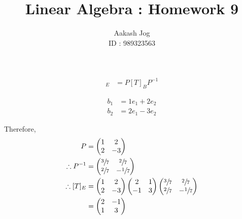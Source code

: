 \documentclass[fleqn, a4paper, twocolumn, draft]{article}
\title{Linear Algebra : Homework 9}
\author{Aakash Jog\\
	ID : 989323563}
\theoremstyle{definition}
\theoremstyle{theorem}
\theoremstyle{remark}
\numberwithin{corollary}{theorem}
\numberwithin{equation}{theorem}
\begin{document}
\maketitle

\section{}

\subsection{}

\begin{align*}
	[T]_E &= P [T]_B P^{-1}
\end{align*}

\begin{align*}
	b_1 &= 1 e_1 + 2 e_2\\
	b_2 &= 2 e_1 - 3 e_2
\end{align*}

Therefore,
\begin{align*}
	P &= 
		\begin{pmatrix}
			1 & 2\\
			2 & -3\\
		\end{pmatrix}\\
	\therefore P^{-1} &= 
		\begin{pmatrix}
			\sfrac{3}{7} & \sfrac{2}{7}\\
			\sfrac{2}{7} & -\sfrac{1}{7}\\
		\end{pmatrix}\\
	\therefore [T]_E &= 
		\begin{pmatrix}
			1 & 2\\
			2 & -3\\
		\end{pmatrix}
		\begin{pmatrix}
			2 & 1\\
			-1 & 3\\
		\end{pmatrix}
		\begin{pmatrix}
			\sfrac{3}{7} & \sfrac{2}{7}\\
			\sfrac{2}{7} & -\sfrac{1}{7}\\
		\end{pmatrix}\\
	&= 
		\begin{pmatrix}
			2 & -1\\
			1 & 3\\
		\end{pmatrix}
\end{align*}
\end{document}
